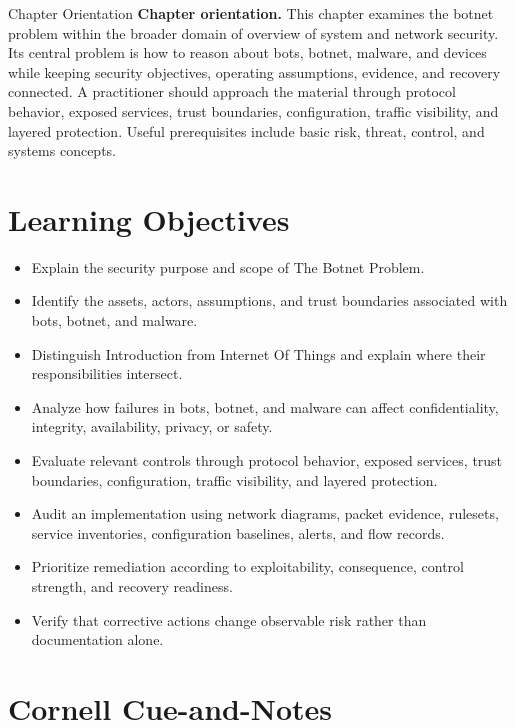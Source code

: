 \documentclass[11pt,letterpaper]{article}
\title{\CornellDocumentTitle}
\author{}
\date{}
\begin{document}
\maketitle
\begin{CornellOverviewBox}{Chapter Orientation}
\textbf{Chapter orientation.} This chapter examines the botnet problem within the broader domain of overview of system and network security. Its central problem is how to reason about bots, botnet, malware, and devices while keeping security objectives, operating assumptions, evidence, and recovery connected. A practitioner should approach the material through protocol behavior, exposed services, trust boundaries, configuration, traffic visibility, and layered protection. Useful prerequisites include basic risk, threat, control, and systems concepts.
\end{CornellOverviewBox}
\section*{Learning Objectives}
\begin{itemize}
\item Explain the security purpose and scope of The Botnet Problem.
\item Identify the assets, actors, assumptions, and trust boundaries associated with bots, botnet, and malware.
\item Distinguish Introduction from Internet Of Things and explain where their responsibilities intersect.
\item Analyze how failures in bots, botnet, and malware can affect confidentiality, integrity, availability, privacy, or safety.
\item Evaluate relevant controls through protocol behavior, exposed services, trust boundaries, configuration, traffic visibility, and layered protection.
\item Audit an implementation using network diagrams, packet evidence, rulesets, service inventories, configuration baselines, alerts, and flow records.
\item Prioritize remediation according to exploitability, consequence, control strength, and recovery readiness.
\item Verify that corrective actions change observable risk rather than documentation alone.
\end{itemize}
\section*{Cornell Cue-and-Notes}
\end{document}
